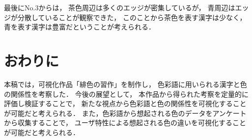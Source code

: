 \documentclass[a4j,twocolumn]{ujarticle} %
\newcommand{\workname}{緋色の習作}
\newcommand{\colorname}{色彩語}
\newcommand{\mysection}[1]{\vspace{-23pt}\section{#1}\vspace{-5pt}}
\begin{document}
最後にNo.3からは，
茶色周辺は多くのエッジが密集しているが，
青周辺はエッジが分散していることが観察できた，
このことから茶色を表す漢字は少なく，
青を表す漢字は豊富だということが考えられる．

\mysection{おわりに}

本稿では，可視化作品「\workname{}」を制作し，
\colorname{}に用いられる漢字と色の関係性を考察した．
今後の展望として，
本作品から得られた考察を定量的に評価し検証することで，
新たな視点から\colorname{}と色の関係性を可視化することが可能だと考えられる．
また，\colorname{}から想起される色のデータをアンケートから収集することで，
ユーザ特性による想起される色の違いを可視化することが可能だと考えられる．

\vspace{-2.5zh}




\end{document}
